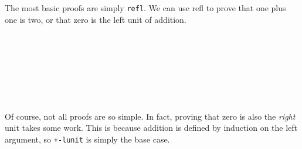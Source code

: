 The most basic proofs are simply \texttt{refl}. We can use refl to prove that one plus one is two,
or that zero is the left unit of addition.
\begin{code}%
\>[0]\<%
\\
\>[0]\AgdaFunction{\AgdaUnderscore{}}\AgdaSpace{}%
\AgdaSymbol{:}\AgdaSpace{}%
\AgdaSymbol{(}\AgdaSpace{}%
\AgdaSymbol{)}\AgdaSpace{}%
\AgdaOperator{\AgdaFunction{+}}\AgdaSpace{}%
\AgdaSymbol{(}\AgdaSpace{}%
\AgdaSymbol{)}\AgdaSpace{}%
\AgdaSpace{}%
\AgdaSpace{}%
\AgdaSymbol{(}\AgdaSpace{}%
\AgdaSymbol{)}\<%
\\
\>[0]\AgdaSymbol{\AgdaUnderscore{}}\AgdaSpace{}%
\AgdaSymbol{=}\AgdaSpace{}%
\<%
\\
%
\\[\AgdaEmptyExtraSkip]%
\>[0]\<%
\\
\>[0]\AgdaSpace{}%
\AgdaSymbol{:}\AgdaSpace{}%
\AgdaSpace{}%
\AgdaSymbol{\{}\AgdaSymbol{\}}\AgdaSpace{}%
\AgdaSpace{}%
\AgdaSpace{}%
\AgdaOperator{\AgdaFunction{+}}\AgdaSpace{}%
\AgdaSpace{}%
\AgdaSpace{}%
\<%
\\
\>[0]\AgdaSpace{}%
\AgdaSymbol{=}\AgdaSpace{}%
\<%
\end{code}
Of course, not all proofs are so simple. In fact, proving that zero is also the \emph{right} unit takes some work.
This is because addition is defined by induction on the left argument, so \texttt{+-lunit} is simply the base case.

